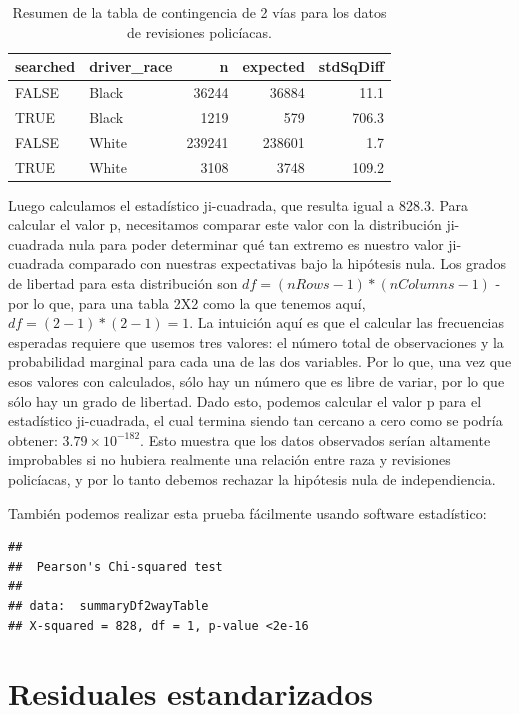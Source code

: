\documentclass[
  12pt,
]{book}
\begin{document}
\begin{table}

\caption{\label{tab:unnamed-chunk-77}Resumen de la tabla de contingencia de 2 vías para los datos de revisiones policíacas.}
\centering
\begin{tabular}[t]{l|l|r|r|r}
\hline
searched & driver\_race & n & expected & stdSqDiff\\
\hline
FALSE & Black & 36244 & 36884 & 11.1\\
\hline
TRUE & Black & 1219 & 579 & 706.3\\
\hline
FALSE & White & 239241 & 238601 & 1.7\\
\hline
TRUE & White & 3108 & 3748 & 109.2\\
\hline
\end{tabular}
\end{table}

Luego calculamos el estadístico ji-cuadrada, que resulta igual a 828.3.
Para calcular el valor p, necesitamos comparar este valor con la distribución ji-cuadrada nula para poder determinar qué tan extremo es nuestro valor ji-cuadrada comparado con nuestras expectativas bajo la hipótesis nula. Los grados de libertad para esta distribución son \(df = (nRows - 1) * (nColumns - 1)\) - por lo que, para una tabla 2X2 como la que tenemos aquí, \(df = (2-1)*(2-1)=1\). La intuición aquí es que el calcular las frecuencias esperadas requiere que usemos tres valores: el número total de observaciones y la probabilidad marginal para cada una de las dos variables. Por lo que, una vez que esos valores con calculados, sólo hay un número que es libre de variar, por lo que sólo hay un grado de libertad. Dado esto, podemos calcular el valor p para el estadístico ji-cuadrada, el cual termina siendo tan cercano a cero como se podría obtener: \(3.79 \times 10^{-182}\). Esto muestra que los datos observados serían altamente improbables si no hubiera realmente una relación entre raza y revisiones policíacas, y por lo tanto debemos rechazar la hipótesis nula de independiencia.

También podemos realizar esta prueba fácilmente usando software estadístico:

\begin{verbatim}
## 
## 	Pearson's Chi-squared test
## 
## data:  summaryDf2wayTable
## X-squared = 828, df = 1, p-value <2e-16
\end{verbatim}

\hypertarget{residuales-estandarizados}{%
\section{Residuales estandarizados}\label{residuales-estandarizados}}
\end{document}

